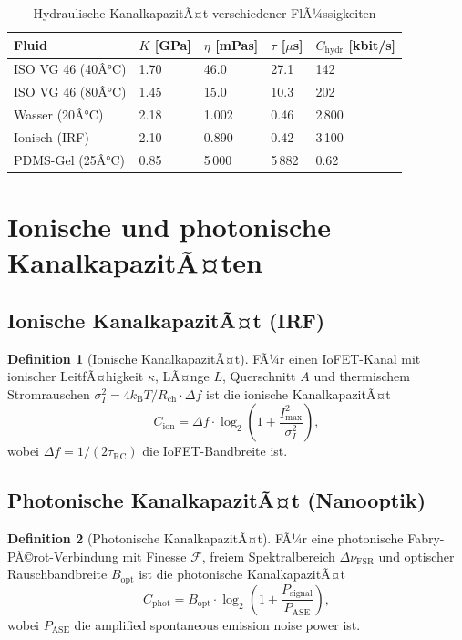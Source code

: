 ﻿\documentclass[a4paper,12pt]{scrreprt}
\theoremstyle{definition}
\newtheorem{definition}{Definition}[section]
\newcommand{\kb}{k_\mathrm{B}}
\begin{document}
\begin{table}[H]
\caption{Hydraulische KanalkapazitÃ¤t verschiedener FlÃ¼ssigkeiten}
\label{tab:nf5_kapaz}
\begin{tabular}{lllll}
\toprule
\textbf{Fluid} & $K$ [GPa] & $\eta$ [mPas] & $\tau$ [$\mu$s] & $C_{\mathrm{hydr}}$ [kbit/s] \\
\midrule
ISO VG 46 (40Â°C) & 1.70 & 46.0  & 27.1 & 142 \\
ISO VG 46 (80Â°C) & 1.45 & 15.0  & 10.3 & 202 \\
Wasser (20Â°C)    & 2.18 & 1.002 & 0.46 & 2\,800 \\
Ionisch (IRF)    & 2.10 & 0.890 & 0.42 & 3\,100 \\
PDMS-Gel (25Â°C)  & 0.85 & 5\,000 & 5\,882 & 0.62 \\
\bottomrule
\end{tabular}
\end{table}

\section{Ionische und photonische KanalkapazitÃ¤ten}

\subsection{Ionische KanalkapazitÃ¤t (IRF)}

\begin{definition}[Ionische KanalkapazitÃ¤t]
  FÃ¼r einen IoFET-Kanal mit ionischer LeitfÃ¤higkeit $\kappa$,
  LÃ¤nge $L$, Querschnitt $A$ und thermischem Stromrauschen
  $\sigma_I^2 = 4\kb T/R_{\mathrm{ch}} \cdot \Delta f$ ist die
  ionische KanalkapazitÃ¤t
  \[
    C_{\mathrm{ion}} = \Delta f \cdot \log_2\!\left(1 +
    \frac{I_{\max}^2}{\sigma_I^2}\right),
  \]
  wobei $\Delta f = 1/(2\tau_{\mathrm{RC}})$ die IoFET-Bandbreite ist.
\end{definition}

\subsection{Photonische KanalkapazitÃ¤t (Nanooptik)}

\begin{definition}[Photonische KanalkapazitÃ¤t]
  FÃ¼r eine photonische Fabry-PÃ©rot-Verbindung mit Finesse $\mathcal{F}$,
  freiem Spektralbereich $\Delta\nu_{\mathrm{FSR}}$ und optischer
  Rauschbandbreite $B_{\mathrm{opt}}$ ist die photonische KanalkapazitÃ¤t
  \[
    C_{\mathrm{phot}} = B_{\mathrm{opt}} \cdot \log_2\!\left(1 +
    \frac{P_{\mathrm{signal}}}{P_{\mathrm{ASE}}}\right),
  \]
  wobei $P_{\mathrm{ASE}}$ die amplified spontaneous emission noise power ist.
\end{definition}
\end{document}
